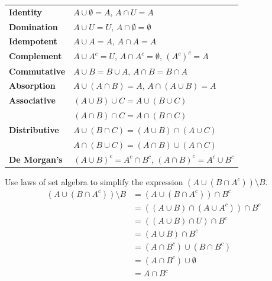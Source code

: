 \renewcommand{\arraystretch}{1.5}
\begin{center}
\begin{tabular}{@{} >{\bfseries}l >{\arraybackslash}m{6.5cm} @{}}

\hline

Identity & $A \cup \emptyset = A$, \quad $A \cap U = A$ \\

Domination & $A \cup U = U$, \quad $A \cap \emptyset = \emptyset$ \\

Idempotent & $A \cup A = A$, \quad $A \cap A = A$ \\

Complement & $A \cup A^c = U$, \quad $A \cap A^c = \emptyset$, \quad $(A^c)^c = A$ \\

Commutative & $A \cup B = B \cup A$, \quad $A \cap B = B \cap A$ \\

Absorption & $A \cup (A \cap B) = A$, \quad $A \cap (A \cup B) = A$ \\

Associative & $(A \cup B) \cup C = A \cup (B \cup C)$ \\ 
			& $(A \cap B) \cap C = A \cap (B \cap C)$ \\

Distributive & $A \cup (B \cap C) = (A \cup B) \cap (A \cup C)$ \\
             & $A \cap (B \cup C) = (A \cap B) \cup (A \cap C)$ \\

De Morgan's & $(A \cup B)^c = A^c \cap B^c$, \quad $(A \cap B)^c = A^c \cup B^c$ \\

\hline

\end{tabular} 
\end{center}

\begin{example}
Use laws of set algebra to simplify the expression $(A \cup (B \cap A^c)) \setminus B$.
$$\begin{aligned}
(A \cup (B \cap A^c)) \setminus B &= (A \cup (B \cap A^c)) \cap B^c \\
&= ((A \cup B) \cap (A \cup A^c)) \cap B^c \\
&= ((A \cup B) \cap U) \cap B^c \\
&= (A \cup B) \cap B^c \\
&= (A \cap B^c) \cup (B \cap B^c) \\
&= (A \cap B^c) \cup \emptyset \\
&= A \cap B^c \\
\end{aligned}$$
\end{example}

